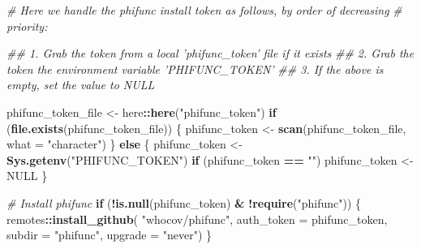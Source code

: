 \documentclass[]{book}
\newenvironment{Shaded}{\begin{snugshade}}{\end{snugshade}}
\newcommand{\CommentTok}[1]{\textcolor[rgb]{0.56,0.35,0.01}{\textit{#1}}}
\newcommand{\ControlFlowTok}[1]{\textcolor[rgb]{0.13,0.29,0.53}{\textbf{#1}}}
\newcommand{\DataTypeTok}[1]{\textcolor[rgb]{0.13,0.29,0.53}{#1}}
\newcommand{\KeywordTok}[1]{\textcolor[rgb]{0.13,0.29,0.53}{\textbf{#1}}}
\newcommand{\NormalTok}[1]{#1}
\newcommand{\OperatorTok}[1]{\textcolor[rgb]{0.81,0.36,0.00}{\textbf{#1}}}
\newcommand{\OtherTok}[1]{\textcolor[rgb]{0.56,0.35,0.01}{#1}}
\newcommand{\StringTok}[1]{\textcolor[rgb]{0.31,0.60,0.02}{#1}}
\begin{document}
\begin{Shaded}
\begin{Highlighting}[]

\CommentTok{# Here we handle the phifunc install token as follows, by order of decreasing}
\CommentTok{# priority:}

\CommentTok{## 1. Grab the token from a local 'phifunc_token' file if it exists}
\CommentTok{## 2. Grab the token the environment variable 'PHIFUNC_TOKEN'}
\CommentTok{## 3. If the above is empty, set the value to NULL}

\NormalTok{phifunc_token_file <-}\StringTok{ }\NormalTok{here}\OperatorTok{::}\KeywordTok{here}\NormalTok{(}\StringTok{"phifunc_token"}\NormalTok{)}
\ControlFlowTok{if}\NormalTok{ (}\KeywordTok{file.exists}\NormalTok{(phifunc_token_file)) \{}
\NormalTok{  phifunc_token <-}\StringTok{ }\KeywordTok{scan}\NormalTok{(phifunc_token_file, }\DataTypeTok{what =} \StringTok{"character"}\NormalTok{)}
\NormalTok{\} }\ControlFlowTok{else}\NormalTok{ \{}
\NormalTok{  phifunc_token <-}\StringTok{ }\KeywordTok{Sys.getenv}\NormalTok{(}\StringTok{"PHIFUNC_TOKEN"}\NormalTok{)}
  \ControlFlowTok{if}\NormalTok{ (phifunc_token }\OperatorTok{==}\StringTok{ ""}\NormalTok{) phifunc_token <-}\StringTok{ }\OtherTok{NULL}
\NormalTok{\}}

\CommentTok{# Install phifunc}
\ControlFlowTok{if}\NormalTok{ (}\OperatorTok{!}\KeywordTok{is.null}\NormalTok{(phifunc_token) }\OperatorTok{&}\StringTok{ }\OperatorTok{!}\KeywordTok{require}\NormalTok{(}\StringTok{"phifunc"}\NormalTok{)) \{}
\NormalTok{  remotes}\OperatorTok{::}\KeywordTok{install_github}\NormalTok{(}
    \StringTok{"whocov/phifunc"}\NormalTok{,}
    \DataTypeTok{auth_token =}\NormalTok{ phifunc_token,}
    \DataTypeTok{subdir =} \StringTok{"phifunc"}\NormalTok{, }\DataTypeTok{upgrade =} \StringTok{"never"}\NormalTok{)}
\NormalTok{\}}
\end{Highlighting}
\end{Shaded}


\end{document}
